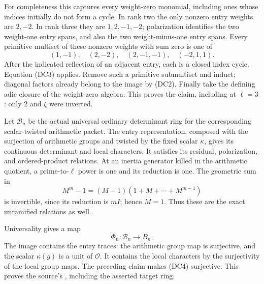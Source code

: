 For completeness this captures every
weight-zero monomial, including ones whose
indices initially do not form a cycle.
In rank two the only nonzero entry weights
are \(2,-2\).
In rank three they are \(1,2,-1,-2\);
polarization identifies the two weight-one
entry spans, and also the two weight-minus-one
entry spans.
Every primitive multiset of these nonzero
weights with sum zero is one of
\[
                 (1,-1),\quad(2,-2),\quad
                        (2,-1,-1),\quad(-2,1,1).
\]
After the indicated reflection of an adjacent
entry, each is a closed index cycle.
Equation (DC3) applies.
Remove such a primitive submultiset and
induct; diagonal factors already belong to
the image by (DC2).
Finally take the defining adic closure of
the weight-zero algebra.
This proves the claim, including at \(\ell=3\):
only \(2\) and \(\zeta\) were inverted.

Let \(\mathcal B_n\) be the actual universal
ordinary determinant ring for the corresponding
scalar-twisted arithmetic packet.
The entry representation, composed with the
surjection of arithmetic groups and twisted
by the fixed scalar \(\kappa\), gives its
continuous determinant and local characters.
It satisfies its residual, polarization, and
ordered-product relations.
At an inertia generator killed in the
arithmetic quotient, a prime-to-\(\ell\)
power is one and its reduction is one.
The geometric sum in
\[
                  M^m-1=(M-1)(1+M+\cdots+M^{m-1})
\]
is invertible, since its reduction is
\(mI\); hence \(M=1\).
Thus these are the exact unramified
relations as well.

Universality gives a map
\[
                       \Phi_n:\mathcal B_n\longrightarrow B_n.
                                                               \tag{DC4}
\]
The image contains the entry traces:
the arithmetic group map is surjective,
and the scalar \(\kappa(g)\) is a unit
of \(\mathcal O\).
It contains the local characters by the
surjectivity of the local group maps.
The preceding claim makes (DC4) surjective.
This proves the source's ,
including the asserted target ring.

